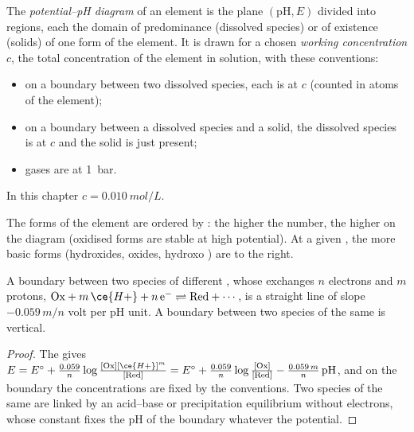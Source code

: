 \begin{definition}\label{def:b1:e-ph-diagrams:e-ph-diagram}
The \emph{potential--pH diagram} of an element
is the plane $(\mathrm{pH}, E)$ divided into regions, each the domain of
predominance (dissolved species) or of existence (solids) of one form of
the element. It is drawn for a chosen \emph{working
concentration} $c$, the total concentration
of the element in solution, with these conventions:
\begin{itemize}
  \item on a boundary between two dissolved species, each is at $c$
        (counted in atoms of the element);
  \item on a boundary between a dissolved species and a solid, the
        dissolved species is at $c$ and the solid is just present;
  \item gases are at \qty{1}{bar}.
\end{itemize}
In this chapter $c = \qty{0.010}{mol/L}$.
\end{definition}

The forms of the element are ordered by : the higher the
number, the higher on the diagram (oxidised forms are stable at high
potential). At a given , the more basic forms
(hydroxides, oxides, hydroxo ) are to the right.

\begin{proposition}\label{prop:b1:e-ph-diagrams:boundary-slope}
A boundary between two species of different , whose
 exchanges $n$ electrons and $m$ protons,
$\mathrm{Ox} + m\,\ce{H+} + n\,\mathrm{e^-} \rightleftharpoons \mathrm{Red} +
\cdots$, is a straight line of slope $-0.059\,m/n$ volt per pH unit. A
boundary between two species of the same  is vertical.
\end{proposition}

\begin{proof}
The  gives $E = E^\circ + \frac{0.059}{n}\log\frac{[\mathrm{Ox}]
[\ce{H+}]^m}{[\mathrm{Red}]} = E^\circ + \frac{0.059}{n}\log\frac{[\mathrm{Ox}]}
{[\mathrm{Red}]} - \frac{0.059\,m}{n}\,\mathrm{pH}$, and on the boundary the
concentrations are fixed by the conventions. Two species of the same
 are linked by an acid--base or precipitation equilibrium
without electrons, whose constant fixes the pH of the boundary
whatever the potential.
\end{proof}

